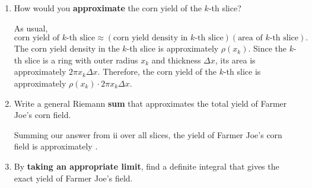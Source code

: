 \documentclass[main]{subfiles}
\begin{document}
\begin{enumerate}
\begin{enumerate}
\begin{enumerate}
    \item
      \begin{problem}[\stretch{1}]
        How would you \textbf{approximate} the corn yield of the $k$-th
        slice?
      \end{problem}    

      \begin{solution}
        As usual,
        \[ \text{corn yield of $k$-th slice} \approx (\text{corn yield
          density in $k$-th slice})(\text{area of $k$-th slice}).\] The
        corn yield density in the $k$-th slice is approximately
        $\rho(x_k)$.  Since the $k$-th slice is a ring with outer radius
        $x_k$ and thickness $\Delta x$, its area is approximately $2 \pi
        x_k \Delta x$.  Therefore, the corn yield of the $k$-th slice is
        approximately $\boxed{\rho(x_k) \cdot 2 \pi x_k \Delta x}$.
      \end{solution}

    \item
      \begin{problem}[\vfill]
        Write a general Riemann \textbf{sum} that approximates the total
        yield of Farmer Joe's corn field.
      \end{problem}

      \begin{solution}
        Summing our answer from {ii} over
        all slices, the yield of Farmer Joe's corn field is approximately
        .
      \end{solution}

    \item


      \begin{problem}[\vfill]
        By \textbf{taking an appropriate limit}, find a definite integral
        that gives the exact yield of Farmer Joe's field. 
      \end{problem}


\end{enumerate}
\end{enumerate}
\end{enumerate}
\end{document}
